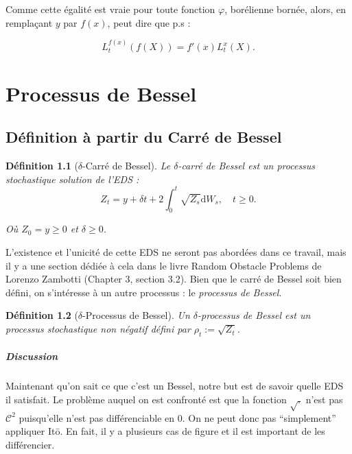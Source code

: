 \documentclass[openany]{book}
\makeatletter
\newcommand{\1}{\mathbbm{1}}
\renewcommand{\d}{\mathrm{d}}
\renewenvironment{proof}[1][\textbf{\textit{Démonstration}}]{%
  \par\pushQED{\qed}%
  \normalfont\topsep6\p@\@plus6\p@\relax
  \trivlist\item[\hskip\labelsep
    #1\@addpunct{.}]\ignorespaces
}{%
  \popQED\endtrivlist\@endpefalse
}
\theoremstyle{thmfont}
\theoremstyle{deffont}
\newtheorem{definition}[definition]{Définition}
\theoremstyle{thmfont}
\theoremstyle{deffont}
\makeatother
\begin{document}
{\begin{proof}
Comme cette égalité est vraie pour toute fonction $\varphi$, borélienne bornée, alors, en remplaçant $y$ par $f(x)$, peut dire que p.s :

$$L_t^{f(x)}(f(X)) =  f'(x) L_t^{x}(X).$$
\end{proof}
}

\chapter{Processus de Bessel}

\section{Définition à partir du Carré de Bessel} 
\begin{definition}[$\delta$-Carré de Bessel] Le \textit{$\delta$-carré de Bessel} est un processus stochastique solution de l'EDS :
  \begin{equation}
    Z_t = y + \delta t + 2 \int_0^t \sqrt{Z_s} \d W_s, \quad t\geq0.
    \label{eq:EDSCarreBessel}
  \end{equation}

  Où $Z_0 = y \geq 0$ et $\delta \geq 0$.
\end{definition}

L'existence et l'unicité de cette EDS ne seront pas abordées dans ce travail, mais il y a une section dédiée à cela dans le livre Random Obstacle Problems de Lorenzo Zambotti (Chapter 3, section 3.2).
Bien que le carré de Bessel soit bien défini, on s’intéresse à un autre processus : le \textit{processus de Bessel}.

\begin{definition}[$\delta$-Processus de Bessel] Un $\delta$-\textit{processus de Bessel} est un processus stochastique non négatif défini par $\rho_t := \sqrt{Z_t}$.
\end{definition}

\paragraph{Discussion}
Maintenant qu'on sait ce que c'est un Bessel, notre but est de savoir quelle EDS il satisfait. Le problème auquel on est confronté est que la fonction $\sqrt{.}$ n'est pas $\mathcal C^2$ puisqu'elle n'est pas différenciable en 0. On ne peut donc pas ``simplement'' appliquer Itō. En fait, il y a plusieurs cas de figure et il est important de les différencier.
\end{document}
